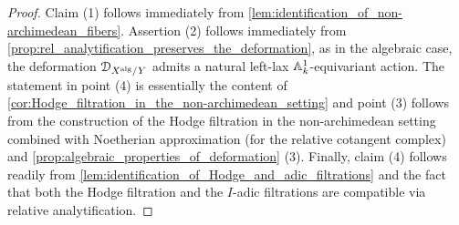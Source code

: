 \documentclass[10pt,a4paper,reqno]{amsart} %
\theoremstyle{plain}
\theoremstyle{definition}
\theoremstyle{remark}
\numberwithin{equation}{section}
\begin{document}
\begin{proof}
    Claim (1) follows immediately from \cref{lem:identification_of_non-archimedean_fibers}. Assertion (2) follows immediately from \cref{prop:rel_analytification_preserves_the_deformation}, as
    in the algebraic case, the deformation $\mathcal D_{X^\mathrm{alg}/ Y}$ admits a natural left-lax $\mathbb A^1_k$-equivariant action. The statement in point (4) is essentially the content
    of \cref{cor:Hodge_filtration_in_the_non-archimedean_setting} and point (3) follows from the construction of the Hodge filtration in the non-archimedean setting combined with Noetherian approximation (for the relative cotangent complex) and
    \cref{prop:algebraic_properties_of_deformation} (3). Finally, claim (4) follows readily from \cref{lem:identification_of_Hodge_and_adic_filtrations} and the fact that
    both the Hodge filtration and the $I$-adic filtrations are compatible via relative analytification.
\end{proof}












\end{document}
